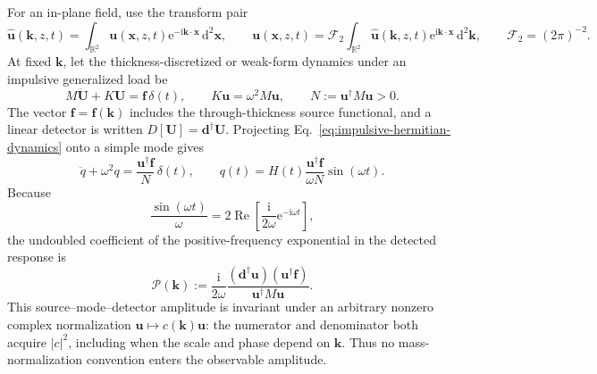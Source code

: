 For an in-plane field, use the transform pair
\begin{equation}
  \widehat{\mathbf u}(\mathbf k,z,t)
  =\int_{\mathbb R^2}\mathbf u(\mathbf x,z,t)
    \mathrm e^{-\mathrm i\mathbf k\cdot\mathbf x}\,\mathrm d^2\mathbf x,
  \qquad
  \mathbf u(\mathbf x,z,t)
  =\mathscr F_2\int_{\mathbb R^2}
    \widehat{\mathbf u}(\mathbf k,z,t)
    \mathrm e^{\mathrm i\mathbf k\cdot\mathbf x}\,\mathrm d^2\mathbf k,
  \qquad
  \mathscr F_2=(2\pi)^{-2}.
  \label{eq:green-fourier-convention}
\end{equation}
At fixed \(\mathbf k\), let the thickness-discretized or weak-form dynamics
under an impulsive generalized load be
\begin{equation}
  M\ddot{\mathbf U}+K\mathbf U
  =\mathbf f\,\delta(t),
  \qquad
  K\mathbf u=\omega^2M\mathbf u,
  \qquad
  N:=\mathbf u^\dagger M\mathbf u>0.
  \label{eq:impulsive-hermitian-dynamics}
\end{equation}
The vector \(\mathbf f=\mathbf f(\mathbf k)\) includes the through-thickness
source functional, and a linear detector is written
\(D[\mathbf U]=\mathbf d^\dagger\mathbf U\).  Projecting
Eq.~\eqref{eq:impulsive-hermitian-dynamics} onto a simple mode gives
\begin{equation}
  \ddot q+\omega^2q
  =\frac{\mathbf u^\dagger\mathbf f}{N}\,\delta(t),
  \qquad
  q(t)=H(t)\frac{\mathbf u^\dagger\mathbf f}{\omega N}\sin(\omega t).
  \label{eq:projected-impulse-oscillator}
\end{equation}
Because
\begin{equation}
  \frac{\sin(\omega t)}{\omega}
  =2\operatorname{Re}\left[
      \frac{\mathrm i}{2\omega}\mathrm e^{-\mathrm i\omega t}
    \right],
  \label{eq:positive-frequency-oscillator-split}
\end{equation}
the undoubled coefficient of the positive-frequency exponential in the
detected response is
\begin{equation}
  \mathcal P(\mathbf k)
  :=\frac{\mathrm i}{2\omega}
    \frac{(\mathbf d^\dagger\mathbf u)
          (\mathbf u^\dagger\mathbf f)}
         {\mathbf u^\dagger M\mathbf u}.
  \label{eq:source-mode-detector-amplitude}
\end{equation}
This source--mode--detector amplitude is invariant under an arbitrary
nonzero complex normalization \(\mathbf u\mapsto c(\mathbf k)\mathbf u\):
the numerator and denominator both acquire \(|c|^2\), including when the
scale and phase depend on \(\mathbf k\).  Thus no mass-normalization
convention enters the observable amplitude.

